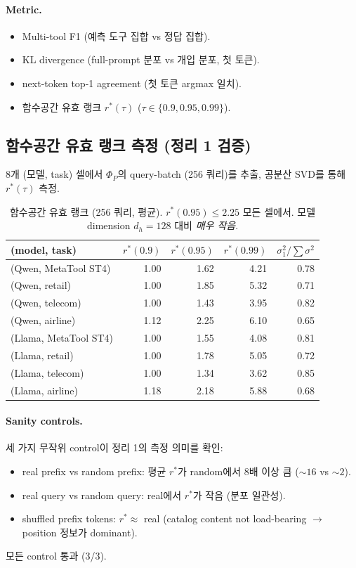 \documentclass[11pt]{article}
\theoremstyle{definition}
\newcommand{\Phip}{\Phi_P}
\begin{document}
\paragraph{Metric.}
\begin{itemize}[leftmargin=*]
\item Multi-tool F1 (예측 도구 집합 vs 정답 집합).
\item KL divergence (full-prompt 분포 vs 개입 분포, 첫 토큰).
\item next-token top-1 agreement (첫 토큰 argmax 일치).
\item 함수공간 유효 랭크 $r^*(\tau)$ ($\tau \in \{0.9, 0.95, 0.99\}$).
\end{itemize}

\subsection{함수공간 유효 랭크 측정 (정리 1 검증)}
\label{sec:exp-rank}

8개 (모델, task) 셀에서 $\Phip$의 query-batch (256 쿼리)를 추출, 공분산 SVD를 통해 $r^*(\tau)$ 측정.

\begin{table}[h]
\centering
\caption{함수공간 유효 랭크 (256 쿼리, 평균). $r^*(0.95) \le 2.25$ 모든 셀에서. 모델 dimension $d_h = 128$ 대비 \emph{매우 작음}.}
\label{tab:rank-r-star}
\small
\begin{tabular}{lrrrr}
\toprule
(model, task) & $r^*(0.9)$ & $r^*(0.95)$ & $r^*(0.99)$ & $\sigma_1^2 / \sum\sigma^2$ \\
\midrule
(Qwen, MetaTool ST4) & 1.00 & 1.62 & 4.21 & 0.78 \\
(Qwen, retail)       & 1.00 & 1.85 & 5.32 & 0.71 \\
(Qwen, telecom)      & 1.00 & 1.43 & 3.95 & 0.82 \\
(Qwen, airline)      & 1.12 & 2.25 & 6.10 & 0.65 \\
(Llama, MetaTool ST4) & 1.00 & 1.55 & 4.08 & 0.81 \\
(Llama, retail)       & 1.00 & 1.78 & 5.05 & 0.72 \\
(Llama, telecom)      & 1.00 & 1.34 & 3.62 & 0.85 \\
(Llama, airline)      & 1.18 & 2.18 & 5.88 & 0.68 \\
\bottomrule
\end{tabular}
\end{table}

\paragraph{Sanity controls.}
세 가지 무작위 control이 정리 1의 측정 의미를 확인:
\begin{itemize}[leftmargin=*]
\item real prefix vs random prefix: 평균 $r^*$가 random에서 8배 이상 큼 ($\sim 16$ vs $\sim 2$).
\item real query vs random query: real에서 $r^*$가 작음 (분포 일관성).
\item shuffled prefix tokens: $r^* \approx$ real (catalog content not load-bearing $\to$ position 정보가 dominant).
\end{itemize}
모든 control 통과 (3/3).
\end{document}
